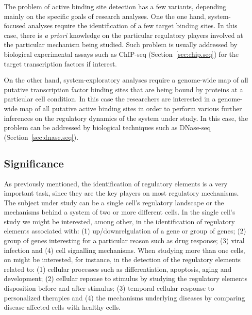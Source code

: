 The problem of active binding site detection has a few variants, depending mainly on the specific goals of research analyses. One the one hand, system-focused analyses require the identification of a few target binding sites. In this case, there is \emph{a priori} knowledge on the particular regulatory players involved at the particular mechanism being studied. Such problem is usually addressed by biological experimental assays such as ChIP-seq (Section~\ref{sec:chip.seq}) for the target transcription factors if interest.

On the other hand, system-exploratory analyses require a genome-wide map of all putative transcription factor binding sites that are being bound by proteins at a particular cell condition. In this case the researchers are interested in a genome-wide map of all putative active binding sites in order to perform various further inferences on the regulatory dynamics of the system under study. In this case, the problem can be addressed by biological techniques such as DNase-seq (Section~\ref{sec:dnase.seq}).

\subsection{Significance}
\label{sec:significance}

As previously mentioned, the identification of regulatory elements is a very important task, since they are the key players on most regulatory mechanisms. The subject under study can be a single cell's regulatory landscape or the mechanisms behind a system of two or more different cells. In the single cell's study we might be interested, among other, in the identification of regulatory elements associated with: (1) up/downrelgulation of a gene or group of genes; (2) group of genes interesting for a particular reason such as drug response; (3) viral infection and (4) cell signalling mechanisms. When studying more than one cells, on might be interested, for instance, in the detection of the regulatory elements related to: (1) cellular processes such as differentiation, apoptosis, aging and development; (2) cellular reponse to stimulus by studying the regulatory elements disposition before and after stimulus; (3) temporal cellular response to personalized therapies and (4) the mechanisms underlying diseases by comparing disease-affected cells with healthy cells.

